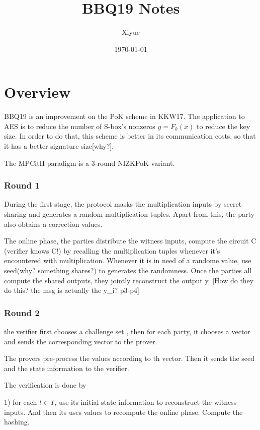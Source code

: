 \documentclass{report}
\begin{document}
\title{\Huge\bf BBQ19 Notes}
\author{Xiyue}
\date{\today}
\maketitle


\section{Overview}
BBQ19 is an improvement on the PoK scheme in KKW17. The application to AES is to reduce the number of S-box's nonzeros $y = F_k(x)$ to reduce the key size. In order to do that, this scheme is better in its communication costs, so that it has a better signature size[why?].

The MPCitH paradigm is a 3-round NIZKPoK variant.

\subsubsection{Round 1}

During the first stage, the protocol masks the multiplication inputs by secret sharing and generates a random multiplication tuples. Apart from this, the party also obtains a correction values. 

The online phase, the parties distribute the witness inputs, compute the circuit C (verifier knows C!) by recalling the multiplication tuples whenever it's encountered with multiplication. Whenever it is in need of a randome value, use seed(why? something shares?) to generates the randomness. Once the parties all compute the shared outputs, they jointly reconstruct the output y. [How do they do this? the msg is actually the y_i? p3-p4]




\subsubsection{Round 2}

the verifier first chooses a challenge set , then for each party, it chooses a vector and sends the corresponding vector to the prover. 

The provers pre-process the values according to th vector. Then it sends the seed and the state information to the verifier.

The verification is done by 

1) for each $t \in T$, use its initial state information to reconstruct the witness inputs. And then its uses values to recompute the online phase. Compute the hashing.
\end{document}
